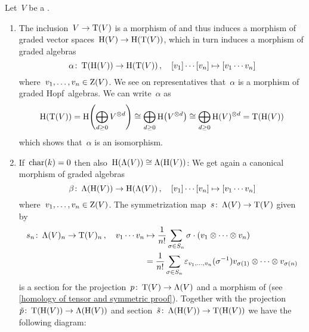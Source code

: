 \documentclass[a4paper,10pt,headings=standardclasses]{scrartcl}
\begin{document}
\begin{example}
  \label{homology of tensor and symmetric}
  Let~$V$ be a {\dgv}.
  \begin{enumerate}
    \item
      The inclusion~$V \to \operatorname{T}(V)$ is a morphism of {\dgvs} and thus induces a morphism of graded vector spaces~$\operatorname{H}(V) \to \operatorname{H}(\operatorname{T}(V))$, which in turn induces a morphism of graded algebras
      \[
        \alpha
        \colon
        \operatorname{T}(\operatorname{H}(V))
        \to
        \operatorname{H}(\operatorname{T}(V)) \,,
        \quad
        [v_1] \dotsm [v_n]
        \mapsto
        [v_1 \dotsm v_n]
      \]
      where~$v_1, \dotsc, v_n \in \operatorname{Z}(V)$.
      We see on representatives that~$\alpha$ is a morphism of graded Hopf~algebras.
      We can write~$\alpha$ as
      \[
        \operatorname{H}(\operatorname{T}(V))
        =
        \operatorname{H}\Biggl( \bigoplus_{d \geq 0} V^{\otimes d} \Biggr)
        \cong
        \bigoplus_{d \geq 0} \operatorname{H}\bigl( V^{\otimes d} \bigr)
        \cong
        \bigoplus_{d \geq 0} \operatorname{H}(V)^{\otimes d}
        =
        \operatorname{T}(\operatorname{H}(V))
      \]
      which shows that~$\alpha$ is an isomorphism.
    \item
      If~$\operatorname{char}(k) = 0$ then also~$\operatorname{H}(\operatorname{\Lambda}(V)) \cong \operatorname{\Lambda}(\operatorname{H}(V))$:
      We get again a canonical morphism of graded algebras
      \[
        \beta
        \colon
        \operatorname{\Lambda}(\operatorname{H}(V))
        \to
        \operatorname{H}(\operatorname{\Lambda}(V)) \,,
        \quad
        [v_1] \dotsm [v_n]
        \mapsto
        [v_1 \dotsm v_n]
      \]
      where~$v_1, \dotsc, v_n \in \operatorname{Z}(V)$.
      The symmetrization map~$s \colon \operatorname{\Lambda}(V) \to \operatorname{T}(V)$ given by
      \begin{align*}
        s_n
        \colon
        \operatorname{\Lambda}(V)_n
        \to
        \operatorname{T}(V)_n \,,
        \quad
        v_1 \dotsm v_n
        &\mapsto
        \frac{1}{n!} \sum_{\sigma \in S_n}
        \sigma \cdot (v_1 \otimes \dotsb \otimes v_n)
        \\
        &=
        \frac{1}{n!}
        \sum_{\sigma \in S_n}
        \varepsilon_{v_1, \dotsc, v_n}(\sigma^{-1})
        v_{\sigma(1)} \otimes \dotsb \otimes v_{\sigma(n)}
      \end{align*}
      is a section for the projection~$p \colon \operatorname{T}(V) \to \operatorname{\Lambda}(V)$ and a morphism of {\dgvs} (see \cref{homology of tensor and symmetric proof}).
      Together with the projection~$\tilde{p} \colon \operatorname{T}(\operatorname{H}(V)) \to \operatorname{\Lambda}(\operatorname{H}(V))$ and section~$\tilde{s} \colon \operatorname{\Lambda}(\operatorname{H}(V)) \to \operatorname{T}(\operatorname{H}(V))$ we have the following diagram:

\end{enumerate}
\end{example}
\end{document}
